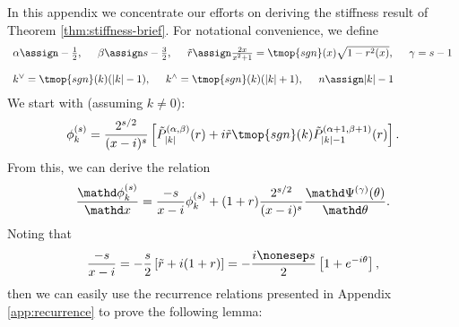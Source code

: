 \label{app:stiffness}In this appendix we concentrate our efforts on deriving
the stiffness result of Theorem \ref{thm:stiffness-brief}. For notational
convenience, we define
\[ \begin{array}{l}
     \alpha \assign - \frac{1}{2},\hspace{0.5cm} \beta \assign s -
     \frac{3}{2},\hspace{0.5cm}  \tilde{r}
     \assign \frac{2 x}{x^2 + 1} = \tmop{sgn} (x) \sqrt{1 - r^2 (x)},
     \hspace{0.5cm} \gamma =
     s - 1\\
     \\
     k^{\vee} = \tmop{sgn} (k) (|k| - 1),\hspace{0.5cm} k^{\wedge} = \tmop{sgn} (k) (|k| +
     1), \hspace{0.5cm} n \assign |k| - 1
   \end{array} \]
We start with (assuming $k \neq 0$):
\[ \phi_k^{(s)} = \frac{2^{s / 2}}{(x - i)^s} \left[ \tilde{P}_{|k|}^{(\alpha,
   \beta)} (r) + i \tilde{r} \tmop{sgn} (k) \tilde{P}_{|k| - 1}^{(\alpha + 1,
   \beta + 1)} (r) \right] . \]
From this, we can derive the relation
\begin{equation}
  \label{eq:phi-diff} \frac{\mathd \phi^{(s)}_k}{\mathd x} = \frac{- s}{x - i}
  \phi_k^{(s)} + (1 + r) \frac{2^{s / 2}}{(x - i)^s}  \frac{\mathd
  \Psi^{(\gamma)} (\theta)}{\mathd \theta} .
\end{equation}
Noting that
\[ \frac{- s}{x - i} = - \frac{s}{2} \left[ \tilde{r} + i (1 + r) \right] = -
   \frac{i \nonesep s}{2} \left[ 1 + e^{- i \theta} \right], \]
then we can easily use the recurrence relations presented in Appendix
\ref{app:recurrence} to prove the following lemma:

